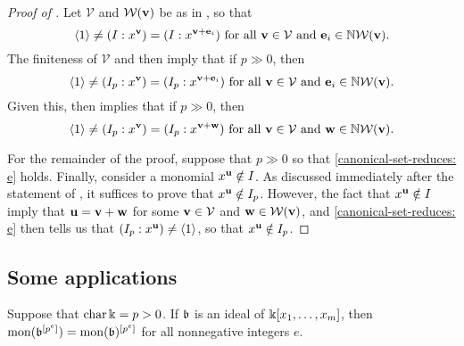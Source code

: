 \documentclass[11pt]{amsart}
\begin{document}
\begin{proof}[Proof of ] Let $\mathcal{V}$ and $\mathcal{W}(\mathbf{v})$ be as in , so that \[ \langle 1 \rangle \neq (I : x^{\mathbf{v}}) = (I : x^{\mathbf{v}+\mathbf{e}_i}) \text{ for all } \mathbf{v} \in \mathcal{V} \text{ and } \mathbf{e}_i \in \mathbb{N} \mathcal{W}(\mathbf{v}).\]
The finiteness of $\mathcal{V}$ and  then imply that if $p \gg 0$, then
\[ \langle 1 \rangle \neq (I_p : x^{\mathbf{v}}) = (I_p : x^{\mathbf{v}+\mathbf{e}_i}) \text{ for all } \mathbf{v} \in \mathcal{V} \text{ and } \mathbf{e}_i \in \mathbb{N} \mathcal{W}(\mathbf{v}).\]
Given this,  then implies that if $p \gg 0$, then
\begin{equation}
\label{canonical-set-reduces: e}
\langle 1 \rangle \neq (I_p : x^{\mathbf{v}}) = (I_p : x^{\mathbf{v}+\mathbf{w}}) \text{ for all } \mathbf{v} \in \mathcal{V} \text{ and } \mathbf{w} \in \mathbb{N} \mathcal{W}(\mathbf{v}).
\end{equation}

For the remainder of the proof, suppose that $p \gg 0$ so that \eqref{canonical-set-reduces: e} holds.  Finally, consider a monomial $x^{\mathbf{u}} \notin I$.  As discussed immediately after the statement of , it suffices to prove that $x^{\mathbf{u}} \notin I_p$.  However,   the fact that $x^{\mathbf{u}} \notin I$ imply that $\mathbf{u} = \mathbf{v} + \mathbf{w}$ for some $\mathbf{v} \in \mathcal{V}$ and $\mathbf{w} \in \mathcal{W}(\mathbf{v})$, and \eqref{canonical-set-reduces: e} then tells us that $(I_p:x^{\mathbf{u}}) \neq \langle 1 \rangle$, so that $x^{\mathbf{u}} \notin I_p$.
\end{proof}


\subsection{Some applications}


\begin{lemma} \label{frobenius-powers+mon-commute: L}
Suppose that $\operatorname{char} \Bbbk = p > 0$.  If $\mathfrak{b}$ is an ideal of $\Bbbk[x_1, \ldots, x_m]$, then $\operatorname{mon}(\mathfrak{b}^{[p^e]}) = \operatorname{mon}(\mathfrak{b})^{[p^e]}$ for all nonnegative integers $e$.
\end{lemma}


\end{document}
